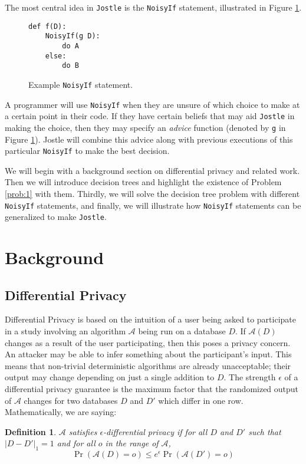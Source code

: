 \documentclass[11pt]{article}
\newtheorem{defn}{Definition}
\newcommand{\Jostle}{\texttt{Jostle}}
\begin{document}
The most central idea in \Jostle{} is the \texttt{NoisyIf} statement, illustrated in Figure \ref{fig:1}.
\begin{figure}
\begin{verbatim}
def f(D):
    NoisyIf(g D):
        do A
    else:
        do B
\end{verbatim}
\caption{Example \texttt{NoisyIf} statement.}
\label{fig:1}
\end{figure}
A programmer will use \texttt{NoisyIf} when they are unsure of which choice to make at a certain point in their code. If they have certain beliefs that may aid \Jostle{} in making the choice, then they may specify an \emph{advice} function (denoted by \texttt{g} in Figure \ref{fig:1}). Jostle will combine this advice along with previous executions of this particular \texttt{NoisyIf} to make the best decision.

We will begin with a background section on differential privacy and related work. Then we will introduce decision trees and highlight the existence of Problem \ref{prob:1} with them. Thirdly, we will solve the decision tree problem with different \texttt{NoisyIf} statements, and finally, we will illustrate how \texttt{NoisyIf} statements can be generalized to make \texttt{Jostle}.

\section{Background}
\subsection{Differential Privacy}
Differential Privacy is based on the intuition of a user being asked to participate in a study involving an algorithm $\mathcal{A}$ being run on a database $D$. If $\mathcal{A}(D)$ changes as a result of the user participating, then this poses a privacy concern. An attacker may be able to infer something about the participant's input. This means that non-trivial deterministic algorithms are already unacceptable; their output may change depending on just a single addition to $D$. The strength $\epsilon$ of a differential privacy guarantee is the maximum factor that the randomized output of $\mathcal{A}$ changes for two databases $D$ and $D'$ which differ in one row. Mathematically, we are saying:

\begin{defn}
$\mathcal{A}$ satisfies $\epsilon$-differential privacy if for all $D$ and $D'$ such that $|D-D'|_1=1$ and for all $o$ in the range of $\mathcal{A}$, 
\[\Pr\left(\mathcal{A}(D) = o \right) \leq e^{\epsilon} \Pr\left(\mathcal{A}(D')=o\right)\]
\end{defn}
\end{document}
